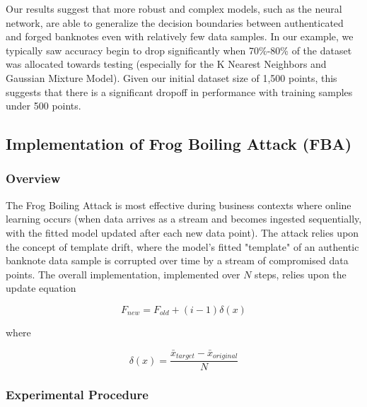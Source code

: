 \documentclass{article}
\begin{document}
\newline\newline
Our results suggest that more robust and complex models, such as the neural network, are able to generalize the decision boundaries between authenticated and forged banknotes even with relatively few data samples. In our example, we typically saw accuracy begin to drop significantly when 70\%-80\% of the dataset was allocated towards testing (especially for the K Nearest Neighbors and Gaussian Mixture Model). Given our initial dataset size of 1,500 points, this suggests that there is a significant dropoff in performance with training samples under 500 points.

\subsection{Implementation of Frog Boiling Attack (FBA)}
\subsubsection{Overview}
The Frog Boiling Attack is most effective during business contexts where online learning occurs (when data arrives as a stream and becomes ingested sequentially, with the fitted model updated after each new data point). The attack relies upon the concept of template drift\cite{template_drift}, where the model's fitted "template" of an authentic banknote data sample is corrupted over time by a stream of compromised data points. The overall implementation, implemented over $N$ steps, relies upon the update equation

\begin{equation}
F_{new} = F_{old} + (i - 1)\delta(x)
\end{equation}

where

\begin{equation}
\delta(x) = \frac{\bar{x}_{target}-\bar{x}_{original}}{N}
\end{equation}

\subsubsection{Experimental Procedure}
\end{document}
